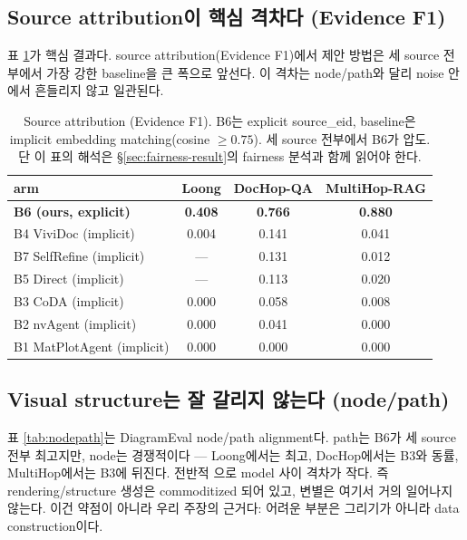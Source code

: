 \documentclass[11pt]{article}
\begin{document}
\subsection{Source attribution이 핵심 격차다 (Evidence F1)}

표 \ref{tab:evidence}가 핵심 결과다. source attribution(Evidence F1)에서 제안 방법은 세 source
전부에서 가장 강한 baseline을 큰 폭으로 앞선다. 이 격차는 node/path와 달리 noise 안에서 흔들리지
않고 일관된다.

\begin{table}[h]
\centering
\small
\begin{tabular}{lccc}
\toprule
arm & Loong & DocHop-QA & MultiHop-RAG \\
\midrule
\textbf{B6 (ours, explicit)} & \textbf{0.408} & \textbf{0.766} & \textbf{0.880} \\
B4 ViviDoc (implicit) & 0.004 & 0.141 & 0.041 \\
B7 SelfRefine (implicit) & --- & 0.131 & 0.012 \\
B5 Direct (implicit) & --- & 0.113 & 0.020 \\
B3 CoDA (implicit) & 0.000 & 0.058 & 0.008 \\
B2 nvAgent (implicit) & 0.000 & 0.041 & 0.000 \\
B1 MatPlotAgent (implicit) & 0.000 & 0.000 & 0.000 \\
\bottomrule
\end{tabular}
\caption{Source attribution (Evidence F1). B6는 explicit source\_eid, baseline은 implicit
embedding matching(cosine $\geq 0.75$). 세 source 전부에서 B6가 압도. 단 이 표의 해석은
\S\ref{sec:fairness-result}의 fairness 분석과 함께 읽어야 한다.}
\label{tab:evidence}
\end{table}

\subsection{Visual structure는 잘 갈리지 않는다 (node/path)}

표 \ref{tab:nodepath}는 DiagramEval node/path alignment다. path는 B6가 세 source 전부 최고지만,
node는 경쟁적이다 — Loong에서는 최고, DocHop에서는 B3와 동률, MultiHop에서는 B3에 뒤진다. 전반적
으로 model 사이 격차가 작다. 즉 rendering/structure 생성은 commoditized 되어 있고, 변별은 여기서
거의 일어나지 않는다. 이건 약점이 아니라 우리 주장의 근거다: 어려운 부분은 그리기가 아니라 data
construction이다.
\end{document}
